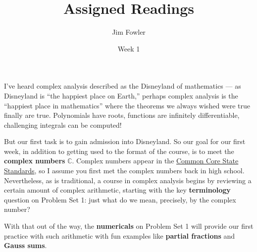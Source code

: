 \documentclass{homework}
\author{Jim Fowler}
\title{Assigned Readings}
\date{Week 1}
\begin{document}
\maketitle

I've heard complex analysis described as the Disneyland of mathematics
--- as Disneyland is ``the happiest place on Earth,'' perhaps complex
analysis is the ``happiest place in mathematics'' where the theorems
we always wished were true finally are true.  Polynomials have roots,
functions are infinitely differentiable, challenging integrals can be
computed!

But our first task is to gain admission into Disneyland.  So our goal
for our first week, in addition to getting used to the format of the
course, is to meet the \textbf{complex numbers} $\mathbb{C}$.  Complex
numbers appear in the
\href{http://www.corestandards.org/Math/Content/HSN/CN/}{Common Core
  State Standards}, so I assume you first met the complex numbers back
in high school.  Nevertheless, as is traditional, a course in complex
analysis begins by reviewing a certain amount of complex arithmetic,
starting with the key \textbf{terminology} question on Problem Set 1:
just what do we mean, precisely, by the complex number?

With that out of the way, the \textbf{numericals} on Problem Set 1
will provide our first practice with such arithmetic with fun examples
like \textbf{partial fractions} and \textbf{Gauss sums}.
\end{document}
